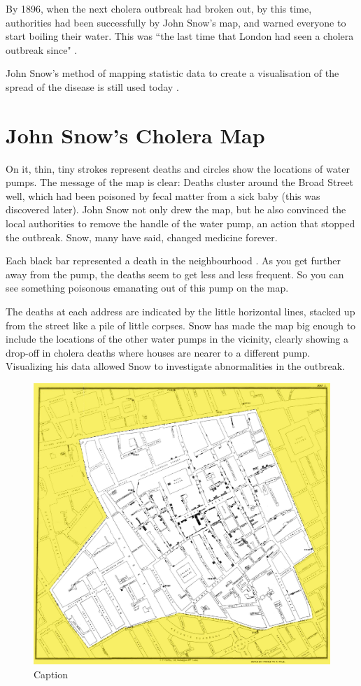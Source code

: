\documentclass[12pt]{article}
\begin{document}
By 1896, when the next cholera outbreak had broken out, by this time, authorities had been successfully by John Snow's map, and warned everyone to start boiling their water. This was ``the last time that London had seen a cholera outbreak since" \cite{tedtalk}.

John Snow's method of mapping statistic data to create a visualisation of the spread of the disease is still used today \cite{channel1}. 

\section{John Snow's Cholera Map}

On it, thin, tiny strokes represent deaths and circles show the locations of water pumps. The message of the map is clear: Deaths cluster around the Broad Street well, which had been poisoned by fecal matter from a sick baby (this was discovered later). John Snow not only drew the map, but he also convinced the local authorities to remove the handle of the water pump, an action that stopped the outbreak. Snow, many have said, changed medicine forever. \cite{heros}

Each black bar represented a death in the neighbourhood \cite{tedtalk}. As you get further away from the pump, the deaths seem to get less and less frequent. So you can see something poisonous emanating out of this pump on the map. 

The deaths at each address are indicated by the little horizontal lines, stacked up from the street like a pile of little corpses. Snow has made the map big enough to include the locations of the other water pumps in the vicinity, clearly showing a drop-off in cholera deaths where houses are nearer to a different pump. Visualizing his data allowed Snow to investigate abnormalities in the outbreak. \cite{blog}

    \begin{figure}
    \centering
    \includegraphics{snowmap_1854}
    \caption{Caption}
    \label{fig:snow}
    \end{figure}
    
\end{document}
